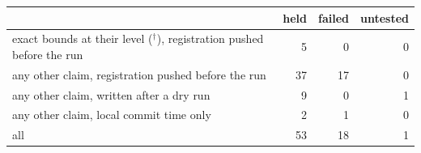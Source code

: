 \begin{tabular}{@{}p{8.6cm} r r r@{}}
\toprule
 & \textbf{held} & \textbf{failed} & \textbf{untested} \\
\midrule
exact bounds at their level ($^\dagger$), registration pushed before the run & 5 & 0 & 0 \\
any other claim, registration pushed before the run & 37 & 17 & 0 \\
any other claim, written after a dry run & 9 & 0 & 1 \\
any other claim, local commit time only & 2 & 1 & 0 \\
all & 53 & 18 & 1 \\
\bottomrule
\end{tabular}
